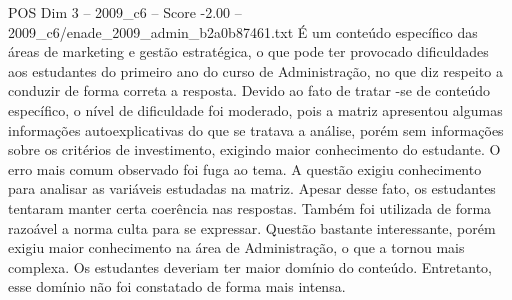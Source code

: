 \begin{textsample}{POS Dim 3 – 2009\_c6 – Score -2.00 – 2009\_c6/enade\_2009\_admin\_b2a0b87461.txt}
É um conteúdo específico das áreas de marketing e gestão estratégica, o que pode ter provocado dificuldades aos estudantes do primeiro ano do curso de Administração, no que diz respeito a conduzir de forma correta a resposta.
Devido ao fato de tratar -se de conteúdo específico, o nível de dificuldade foi moderado, pois a matriz apresentou algumas informações autoexplicativas do que se tratava a análise, porém sem informações sobre os critérios de investimento, exigindo maior conhecimento do estudante.
O erro mais comum observado foi fuga ao tema.
A questão exigiu conhecimento para analisar as variáveis estudadas na matriz.
Apesar desse fato, os estudantes tentaram manter certa coerência nas respostas.
Também foi utilizada de forma razoável a norma culta para se expressar.
Questão bastante interessante, porém exigiu maior conhecimento na área de Administração, o que a tornou mais complexa.
Os estudantes deveriam ter maior domínio do conteúdo.
Entretanto, esse domínio não foi constatado de forma mais intensa.

\end{textsample}
